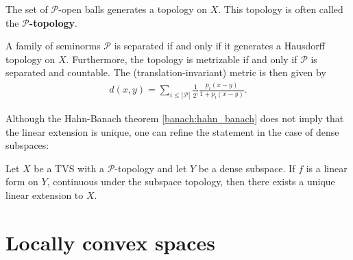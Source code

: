     \begin{property}
        The set of $\mathscr{P}$-open balls generates a topology on $X$. This topology is often called the \textbf{$\mathscr{P}$-topology}.
    \end{property}
    \begin{property}\label{hilbert:separated_metric}
        A family of seminorms $\mathcal{P}$ is separated if and only if it generates a Hausdorff topology on $X$. Furthermore, the topology is metrizable if and only if $\mathcal{P}$ is separated and countable. The (translation-invariant) metric is then given by
        \begin{gather}
            d(x, y) = \sum_{i\leq|\mathcal{P}|}\frac{1}{2^i}\frac{p_i(x-y)}{1 + p_i(x-y)}.
        \end{gather}
    \end{property}

    Although the Hahn-Banach theorem \ref{banach:hahn_banach} does not imply that the linear extension is unique, one can refine the statement in the case of dense subspaces:
    \begin{result}
        Let $X$ be a TVS with a $\mathscr{P}$-topology and let $Y$ be a dense subspace. If $f$ is a linear form on $Y$, continuous under the subspace topology, then there exists a unique linear extension to $X$.
    \end{result}

\section{Locally convex spaces}

